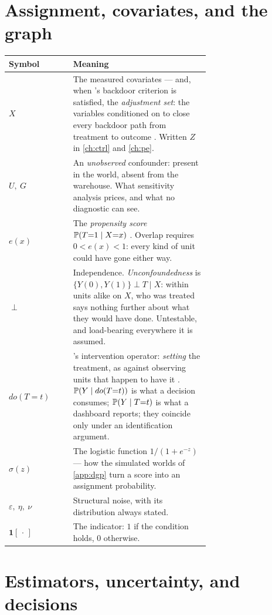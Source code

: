 \section*{Assignment, covariates, and the graph}

\begin{center}
\small
\begin{longtable}{@{}l@{\hspace{1.5em}}p{0.68\linewidth}@{}}
\toprule
\textbf{Symbol} & \textbf{Meaning} \\
\midrule
\endhead
$X$ & The measured covariates --- and, when \citeauthor{pearl1995}'s backdoor criterion is
  satisfied, the \emph{adjustment set}: the variables conditioned on to close every backdoor path
  from treatment to outcome \citep{pearl1995}. Written $Z$ in \cref{ch:ctrl} and
  \cref{ch:pe}. \\[2pt]
$U,\ G$ & An \emph{unobserved} confounder: present in the world, absent from the warehouse. What
  sensitivity analysis prices, and what no diagnostic can see. \\[2pt]
$e(x)$ & The \emph{propensity score} $\operatorname{\mathbb{P}}(T{=}1 \mid X{=}x)$ \citep{rosenbaum1983}. Overlap
  requires $0 < e(x) < 1$: every kind of unit could have gone either way. \\[2pt]
$\perp$ & Independence. \emph{Unconfoundedness} is $\{Y(0), Y(1)\} \perp T \mid X$: within units
  alike on $X$, who was treated says nothing further about what they would have done. Untestable,
  and load-bearing everywhere it is assumed. \\[2pt]
$do(T{=}t)$ & \citeauthor{pearl2009}'s intervention operator: \emph{setting} the treatment, as
  against observing units that happen to have it \citep{pearl2009}. $\operatorname{\mathbb{P}}(Y \mid do(T{=}t))$ is
  what a decision consumes; $\operatorname{\mathbb{P}}(Y \mid T{=}t)$ is what a dashboard reports; they coincide only
  under an identification argument. \\[2pt]
$\sigma(z)$ & The logistic function $1/(1 + e^{-z})$ --- how the simulated worlds of
  \cref{app:dgp} turn a score into an assignment probability. \\[2pt]
$\varepsilon,\ \eta,\ \nu$ & Structural noise, with its distribution always stated. \\[2pt]
$\mathbf 1[\,\cdot\,]$ & The indicator: $1$ if the condition holds, $0$ otherwise. \\
\bottomrule
\end{longtable}
\end{center}

\section*{Estimators, uncertainty, and decisions}

